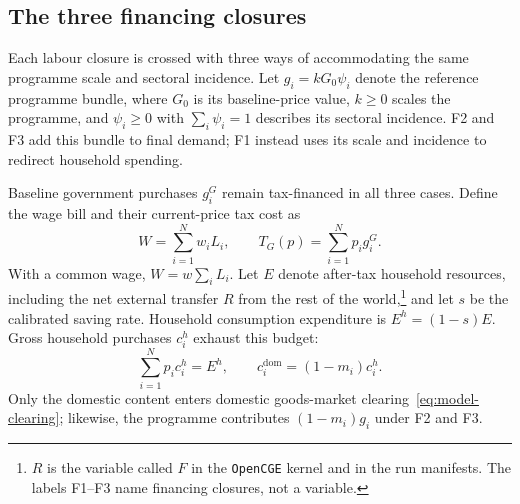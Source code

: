 \subsection{The three financing closures}\label{app:financing-closures}

Each labour closure is crossed with three ways of accommodating the same
programme scale and sectoral incidence. Let $g_i = kG_0\psi_i$ denote the
reference programme bundle, where $G_0$ is its baseline-price value,
$k \geq 0$ scales the programme, and $\psi_i \geq 0$ with
$\sum_i\psi_i = 1$ describes its sectoral incidence. F2 and F3 add this
bundle to final demand; F1 instead uses its scale and incidence to redirect
household spending.

Baseline government purchases $g_i^G$ remain tax-financed in all three
cases. Define the wage bill and their current-price tax cost as
\begin{equation}
W = \sum_{i=1}^N w_i L_i,
\qquad T_G(p) = \sum_{i=1}^N p_i g_i^G.
\label{eq:financing-baseline-budget}
\end{equation}
With a common wage, $W = w\sum_i L_i$. Let $E$ denote after-tax household
resources, including the net external transfer $R$ from the rest of the
world,\footnote{$R$ is the variable called $F$ in the \texttt{OpenCGE}
kernel and in the run manifests. The labels F1--F3 name financing closures,
not a variable.} and let $s$ be the
calibrated saving rate. Household consumption expenditure is
$E^h = (1-s)E$. Gross household purchases $c_i^h$ exhaust this budget:
\begin{equation}
\sum_{i=1}^N p_i c_i^h = E^h,
\qquad c_i^{\mathrm{dom}} = (1-m_i)c_i^h.
\label{eq:financing-household-budget}
\end{equation}
Only the domestic content enters domestic goods-market
clearing~\eqref{eq:model-clearing}; likewise, the programme contributes
$(1-m_i)g_i$ under F2 and F3.

